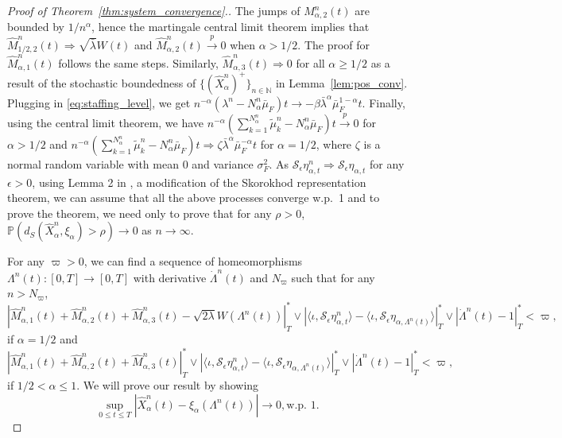 \documentclass[a4paper,11pt,twoside]{article}
\numberwithin{equation}{section}
\numberwithin{figure}{section}
\theoremstyle{plain}
\newcommand{\cS}{\mathcal{S}}
\newcommand{\NN}{\mathbb{N}}
\newcommand{\PP}{\mathbb{P}}
\newcommand{\1}{\mathbbm{1}}
\newcommand{\toP}{\stackrel{p}{\rightarrow}}
\begin{document}
\begin{proof}[Proof of Theorem~\ref{thm:system_convergence}.]
The jumps of $M_{\alpha,2}^n(t)$ are bounded by $1/n^{\alpha}$, hence the martingale central limit theorem implies that $\hat{M}_{1/2,2}^n(t)\Rightarrow \sqrt{\bar{\lambda}}W(t)$  and $\hat{M}_{\alpha,2}^n(t)\toP 0$ when $\alpha>1/2$. The proof for $\hat{M}_{\alpha,1}^n(t)$ follows the same steps. Similarly, $\hat{M}_{\alpha,3}^n(t)\Rightarrow 0$ for all $\alpha\geq 1/2$ as a result of the stochastic boundedness of $\{(\hat{X}_\alpha^n)^+\}_{n\in \NN}$ in Lemma~\ref{lem:pos_conv}. 
Plugging in \eqref{eq:staffing_level}, we get $n^{-\alpha}(\lambda^n-N_\alpha^n\bar{\mu}_F)t\to -\beta\bar{\lambda}^\alpha\bar{\mu}_F^{1-\alpha}t$. Finally, using the central limit theorem, we have $n^{-\alpha}\left(\sum_{k=1}^{N_\alpha^n}\tilde{\mu}_k^n-N_\alpha^n\bar{\mu}_F\right)t\toP 0$ for $\alpha>1/2$ and $n^{-\alpha}\left(\sum_{k=1}^{N_\alpha^n}\tilde{\mu}_k^n-N_\alpha^n\bar{\mu}_F\right)t\Rightarrow \zeta\bar{\lambda}^\alpha\bar{\mu}_F^{-\alpha}t$ for $\alpha=1/2$, where $\zeta$ is a normal random variable with mean 0 and variance $\sigma_F^2$. 
As $\cS_\epsilon\eta_{\alpha,t}^n\Rightarrow \cS_\epsilon\eta_{\alpha,t}$ for any $\epsilon>0$, using Lemma 2 in \cite{bukeqin2019}, a modification of the Skorokhod representation theorem, we can assume that all the above processes converge w.p.~1 and to prove the theorem, we need only to prove that for any $\rho>0$, $\PP(d_S(\hat{X}_\alpha^n, \xi_\alpha)>\rho)\to 0$ as $n\to \infty$. 

For any $\varpi>0$, we can find a sequence of homeomorphisms $\Lambda^n(t):[0,T]\to[0,T]$ with derivative $\dot{\Lambda}^n(t)$ and $N_\varpi$ such that for any $n>N_\varpi$,
\[
\left|\hat{M}_{\alpha, 1}^n(t)+\hat{M}_{\alpha, 2}^n(t)+\hat{M}_{\alpha, 3}^n (t)-\sqrt{2\lambda}W(\Lambda^n(t))\right|_T^*\vee \left|\langle\iota, \cS_\epsilon\eta_{\alpha,t}^{n}\rangle- \langle\iota, \cS_\epsilon\eta_{\alpha,\Lambda^n(t)}\rangle\right|_T^*\vee \left|\dot{\Lambda}^n(t)-1\right|_T^*<\varpi,
\]
if $\alpha=1/2$ and
\[
\left|\hat{M}_{\alpha, 1}^n(t)+\hat{M}_{\alpha, 2}^n(t)+\hat{M}_{\alpha, 3}^n (t)\right|_T^*\vee \left|\langle\iota, \cS_\epsilon\eta_{\alpha,t}^{n}\rangle- \langle\iota, \cS_\epsilon\eta_{\alpha,\Lambda^n(t)}\rangle\right|_T^*\vee \left|\dot{\Lambda}^n(t)-1\right|_T^*<\varpi,
\]
if $1/2<\alpha\leq 1$.
We will prove our result by showing 
\begin{equation}
\sup_{0\leq t\leq T}\left|\hat{X}_\alpha^n(t)-\xi_\alpha(\Lambda^n(t))\right|\to 0, \mbox{w.p. }1.  \label{eq:conv_system}
\end{equation}  


\end{proof}
\end{document}
